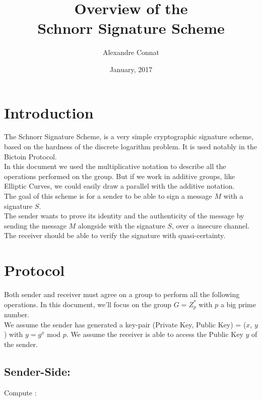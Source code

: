 \documentclass{article}
\title{Overview of the\\Schnorr Signature Scheme}
\author{Alexandre Connat}
\date{January, 2017}
\begin{document}
\maketitle





\section{Introduction}

The Schnorr Signature Scheme, is a very simple cryptographic signature scheme, based on the hardness of the discrete logarithm problem. It is used notably in the Bictoin Protocol. \\
In this document we used the multiplicative notation to describe all the operations performed on the group. But if we work in additive groups, like Elliptic Curves, we could easily draw a parallel with the additive notation.  \\

\noindent
The goal of this scheme is for a sender to be able to sign a message $M$ with a signature $S$. \\
The sender wants to prove its identity and the authenticity of the message by sending the message $M$ alongside with the signature $S$, over a insecure channel. \\
The receiver should be able to verify the signature with quasi-certainty.







\section{Protocol}

Both sender and receiver must agree on a group to perform all the following operations. In this document, we'll focus on the group $G = Z_p^*$ with $p$ a big prime number. \\

\noindent
We assume the sender has generated a key-pair (Private Key, Public Key) = ($x$, $y$) with $y = g^x$ mod $p$.
We assume the receiver is able to access the Public Key $y$ of the sender.


\subsection{Sender-Side:}

Compute : \
\end{document}
